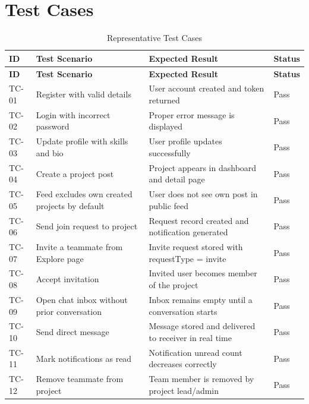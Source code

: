 \documentclass[12pt,a4paper,oneside]{report}
\begin{document}
\section{Test Cases}
{\small
\setlength{\tabcolsep}{4pt}
\begin{longtable}{C{0.55in}L{1.75in}L{2.35in}C{0.65in}}
\caption{Representative Test Cases} \\
\toprule
\textbf{ID} & \textbf{Test Scenario} & \textbf{Expected Result} & \textbf{Status} \\
\midrule
\endfirsthead
\toprule
\textbf{ID} & \textbf{Test Scenario} & \textbf{Expected Result} & \textbf{Status} \\
\midrule
\endhead
TC-01 & Register with valid details & User account created and token returned & Pass \\
TC-02 & Login with incorrect password & Proper error message is displayed & Pass \\
TC-03 & Update profile with skills and bio & User profile updates successfully & Pass \\
TC-04 & Create a project post & Project appears in dashboard and detail page & Pass \\
TC-05 & Feed excludes own created projects by default & User does not see own post in public feed & Pass \\
TC-06 & Send join request to project & Request record created and notification generated & Pass \\
TC-07 & Invite a teammate from Explore page & Invite request stored with requestType = invite & Pass \\
TC-08 & Accept invitation & Invited user becomes member of the project & Pass \\
TC-09 & Open chat inbox without prior conversation & Inbox remains empty until a conversation starts & Pass \\
TC-10 & Send direct message & Message stored and delivered to receiver in real time & Pass \\
TC-11 & Mark notifications as read & Notification unread count decreases correctly & Pass \\
TC-12 & Remove teammate from project & Team member is removed by project lead/admin & Pass \\
\bottomrule
\end{longtable}
}
\end{document}
